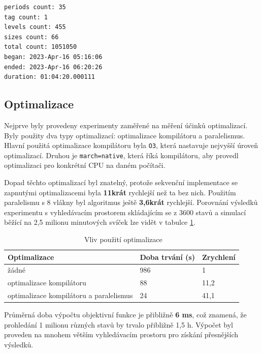 \begin{lstlisting}[caption={~Rozšíření logu pro algoritmus hrubé síly},label={lst:brute:force:log},captionpos=t,abovecaptionskip=-\medskipamount,belowcaptionskip=\medskipamount]
periods count: 35
tag count: 1
levels count: 455
sizes count: 66
total count: 1051050
began: 2023-Apr-16 05:16:06
ended: 2023-Apr-16 06:20:26
duration: 01:04:20.000111
\end{lstlisting}

\subsection{Optimalizace}
Nejprve byly provedeny experimenty zaměřené na měření účinků optimalizací.
Byly použity dva typy optimalizací: optimalizace kompilátoru a paralelismus.
Hlavní použitá optimalizace kompilátoru byla \texttt{O3}, která nastavuje nejvyšší úroveň optimalizací.
Druhou je \texttt{march=native}, která říká kompilátoru, aby provedl optimalizaci pro konkrétní CPU na daném počítači.

Dopad těchto optimalizací byl znatelný, protože sekvenční implementace se zapnutými optimalizacemi byla \textbf{11krát} rychlejší než ta bez nich.
Použitím paralelismu s 8 vlákny byl algoritmus ještě \textbf{3,6krát} rychlejší.
Porovnání výsledků experimentu s vyhledávacím prostorem skládajícím se z 3600 stavů a simulací běžící na 2,5 milionu minutových svíček lze vidět v tabulce \ref{tab:brute:force:optimization}.

\begin{table}[!htbp]
\centering
\caption[Vliv použití optimalizace]{~Vliv použití optimalizace}\label{tab:brute:force:optimization}
\begin{tabular}{|l|l|l|}
\hline
\textbf{Optimalizace}                  & \textbf{Doba trvání (s)} & \textbf{Zrychlení} \\ \hline
žádné                                   & 986                      & 1                                                     \\ \hline
optimalizace kompilátoru                & 88                       & 11,2                                                  \\ \hline
optimalizace kompilátoru a paralelismus & 24                       & 41,1                                                   \\ \hline
\end{tabular}
\end{table}

Průměrná doba výpočtu objektivní funkce je přibližně \textbf{6 ms}, což znamená, že prohledání 1 milionu různých stavů by trvalo přibližně 1,5 h.
Výpočet byl proveden na mnohem větším vyhledávacím prostoru pro získání přesnějších výsledků.

